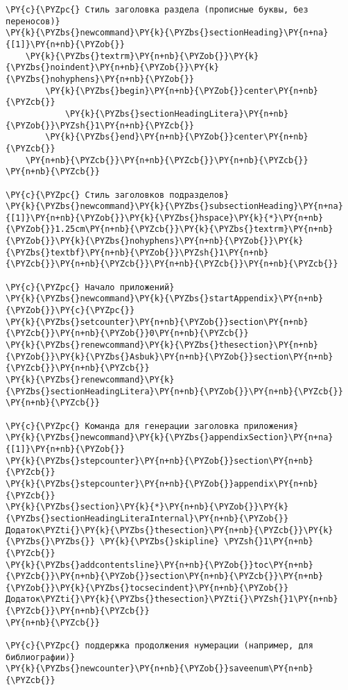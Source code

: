 \begin{Verbatim}[commandchars=\\\{\}]
\PY{c}{\PYZpc{} Стиль заголовка раздела (прописные буквы, без переносов)}
\PY{k}{\PYZbs{}newcommand}\PY{k}{\PYZbs{}sectionHeading}\PY{n+na}{[1]}\PY{n+nb}{\PYZob{}}
	\PY{k}{\PYZbs{}textrm}\PY{n+nb}{\PYZob{}}\PY{k}{\PYZbs{}noindent}\PY{n+nb}{\PYZob{}}\PY{k}{\PYZbs{}nohyphens}\PY{n+nb}{\PYZob{}}
		\PY{k}{\PYZbs{}begin}\PY{n+nb}{\PYZob{}}center\PY{n+nb}{\PYZcb{}}
			\PY{k}{\PYZbs{}sectionHeadingLitera}\PY{n+nb}{\PYZob{}}\PYZsh{}1\PY{n+nb}{\PYZcb{}}
		\PY{k}{\PYZbs{}end}\PY{n+nb}{\PYZob{}}center\PY{n+nb}{\PYZcb{}}
	\PY{n+nb}{\PYZcb{}}\PY{n+nb}{\PYZcb{}}\PY{n+nb}{\PYZcb{}}
\PY{n+nb}{\PYZcb{}}

\PY{c}{\PYZpc{} Стиль заголовков подразделов}
\PY{k}{\PYZbs{}newcommand}\PY{k}{\PYZbs{}subsectionHeading}\PY{n+na}{[1]}\PY{n+nb}{\PYZob{}}\PY{k}{\PYZbs{}hspace}\PY{k}{*}\PY{n+nb}{\PYZob{}}1.25cm\PY{n+nb}{\PYZcb{}}\PY{k}{\PYZbs{}textrm}\PY{n+nb}{\PYZob{}}\PY{k}{\PYZbs{}nohyphens}\PY{n+nb}{\PYZob{}}\PY{k}{\PYZbs{}textbf}\PY{n+nb}{\PYZob{}}\PYZsh{}1\PY{n+nb}{\PYZcb{}}\PY{n+nb}{\PYZcb{}}\PY{n+nb}{\PYZcb{}}\PY{n+nb}{\PYZcb{}}

\PY{c}{\PYZpc{} Начало приложений}
\PY{k}{\PYZbs{}newcommand}\PY{k}{\PYZbs{}startAppendix}\PY{n+nb}{\PYZob{}}\PY{c}{\PYZpc{}}
\PY{k}{\PYZbs{}setcounter}\PY{n+nb}{\PYZob{}}section\PY{n+nb}{\PYZcb{}}\PY{n+nb}{\PYZob{}}0\PY{n+nb}{\PYZcb{}}
\PY{k}{\PYZbs{}renewcommand}\PY{k}{\PYZbs{}thesection}\PY{n+nb}{\PYZob{}}\PY{k}{\PYZbs{}Asbuk}\PY{n+nb}{\PYZob{}}section\PY{n+nb}{\PYZcb{}}\PY{n+nb}{\PYZcb{}}
\PY{k}{\PYZbs{}renewcommand}\PY{k}{\PYZbs{}sectionHeadingLitera}\PY{n+nb}{\PYZob{}}\PY{n+nb}{\PYZcb{}}
\PY{n+nb}{\PYZcb{}}

\PY{c}{\PYZpc{} Команда для генерации заголовка приложения}
\PY{k}{\PYZbs{}newcommand}\PY{k}{\PYZbs{}appendixSection}\PY{n+na}{[1]}\PY{n+nb}{\PYZob{}}
\PY{k}{\PYZbs{}stepcounter}\PY{n+nb}{\PYZob{}}section\PY{n+nb}{\PYZcb{}}
\PY{k}{\PYZbs{}stepcounter}\PY{n+nb}{\PYZob{}}appendix\PY{n+nb}{\PYZcb{}}
\PY{k}{\PYZbs{}section}\PY{k}{*}\PY{n+nb}{\PYZob{}}\PY{k}{\PYZbs{}sectionHeadingLiteraInternal}\PY{n+nb}{\PYZob{}}Додаток\PYZti{}\PY{k}{\PYZbs{}thesection}\PY{n+nb}{\PYZcb{}}\PY{k}{\PYZbs{}\PYZbs{}} \PY{k}{\PYZbs{}skipline} \PYZsh{}1\PY{n+nb}{\PYZcb{}}
\PY{k}{\PYZbs{}addcontentsline}\PY{n+nb}{\PYZob{}}toc\PY{n+nb}{\PYZcb{}}\PY{n+nb}{\PYZob{}}section\PY{n+nb}{\PYZcb{}}\PY{n+nb}{\PYZob{}}\PY{k}{\PYZbs{}tocsecindent}\PY{n+nb}{\PYZob{}}Додаток\PYZti{}\PY{k}{\PYZbs{}thesection}\PYZti{}\PYZsh{}1\PY{n+nb}{\PYZcb{}}\PY{n+nb}{\PYZcb{}}
\PY{n+nb}{\PYZcb{}}

\PY{c}{\PYZpc{} поддержка продолжения нумерации (например, для библиографии)}
\PY{k}{\PYZbs{}newcounter}\PY{n+nb}{\PYZob{}}saveenum\PY{n+nb}{\PYZcb{}}


\end{Verbatim}
